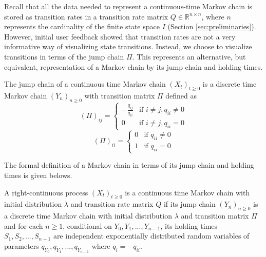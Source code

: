 Recall that all the data needed to represent a continuous-time Markov chain
is stored as transition rates in a transition rate matrix $Q \in \mathbb{R}^{n \times n}$, where $n$ represents
the cardinality of the finite state space $I$ (Section \ref{sec:preliminaries}). However, initial user
feedback showed that transition rates are not a very informative way of visualizing state transitions. Instead, 
we choose to visualize transitions in terms of the jump chain $\Pi$.
This represents an alternative, but equivalent, representation of a Markov chain by its jump chain and holding times. 

The jump chain of a continuous time Markov chain $(X_t)_{t \ge 0}$ is
a discrete time Markov chain $(Y_n)_{n \ge 0}$ with transition matrix $\Pi$ defined as
\begin{equation}
	\nonumber
	\left(\Pi\right)_{ij} = 
		\left\{
			\begin{array}{ll}
				-\frac{q_{ij}}{q_{ii}} & \mbox{if } i \ne j, q_{ii} \ne 0 \\
				0 & \mbox{if } i \ne j, q_{ii} = 0
			\end{array}
		\right.
\end{equation}
\begin{equation}
	\nonumber
	\left(\Pi\right)_{ii} = 
		\left\{
			\begin{array}{ll}
				0 & \mbox{if } q_{ii} \ne 0 \\
				1 & \mbox{if } q_{ii} = 0
			\end{array}
		\right.
\end{equation}

The formal definition of a Markov chain in terms of its jump chain and holding times is given belows.
\begin{defn}
	\label{def:jump-chain-holding-times}
	A right-continuous process $(X_t)_{t \ge 0}$ is a continuous time Markov chain with initial
	distribution $\lambda$ and transition rate matrix $Q$ if its jump chain $(Y_n)_{n \ge 0}$ is a 
	discrete time Markov chain with initial distribution $\lambda$ and transition matrix $\Pi$ and
	for each $n \ge 1$, conditional on $Y_0, Y_1, ..., Y_{n-1}$, its holding times $S_1, S_2, ..., S_{n-1}$
	are independent exponentially distributed random variables of parameters $q_{Y_0}, q_{Y_1}, ..., q_{Y_{n-1}}$
	where $q_i = -q_{ii}$.
\end{defn}

